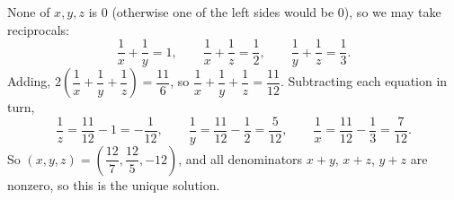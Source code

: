 None of $x,y,z$ is $0$ (otherwise one of the left sides would be $0$), so we may take reciprocals:
\[\dfrac1x+\dfrac1y=1,\qquad\dfrac1x+\dfrac1z=\dfrac12,\qquad\dfrac1y+\dfrac1z=\dfrac13.\]
Adding, $2\left(\dfrac1x+\dfrac1y+\dfrac1z\right)=\dfrac{11}{6}$, so $\dfrac1x+\dfrac1y+\dfrac1z=\dfrac{11}{12}$. Subtracting each equation in turn,
\[\dfrac1z=\dfrac{11}{12}-1=-\dfrac1{12},\qquad\dfrac1y=\dfrac{11}{12}-\dfrac12=\dfrac5{12},\qquad\dfrac1x=\dfrac{11}{12}-\dfrac13=\dfrac7{12}.\]
So $\boxed{(x,y,z)=\left(\dfrac{12}{7},\dfrac{12}{5},-12\right)}$, and all denominators $x+y$, $x+z$, $y+z$ are nonzero, so this is the unique solution.
